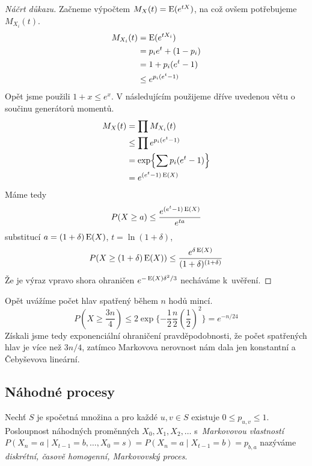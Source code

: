 \begin{proof}[Náčrt důkazu]

Začneme výpočtem $M_X(t) = \operatorname{E}(e^{tX})$, na což
ovšem potřebujeme $M_{X_i}(t)$.
\begin{align*}
    M_{X_i}(t) &= \operatorname{E}(e^{t X_i}) \\
    &= p_i e^t + (1 - p_i) \\
    &= 1 + p_i (e^t - 1) \\
    &\leq e^{p_i(e^t - 1)}
\end{align*}
Opět jsme použili $1 + x \leq e^x$. V následujícím použijeme dříve
uvedenou větu o součinu generátorů momentů.
\begin{align*}
    M_X(t) &= \prod M_{X_i}(t) \\
    &\leq \prod e^{p_i(e^t - 1)} \\
    &= \exp{\sum p_i(e^t - 1)} \\
    &= e^{(e^t-1)\operatorname{E}(X)}
\end{align*}
Máme tedy
\[
    P(X \geq a) \leq \frac{e^{(e^t-1)\operatorname{E}(X)}}{e^{ta}}
\]
substitucí $a = (1+\delta)\operatorname{E}(X)$, $t = \ln(1 + \delta)$,
\[
    P(X \geq (1 + \delta) \operatorname{E}(X)) \leq
    \frac{e^{\delta \operatorname{E}(X)}}{(1+\delta)^{(1+\delta)}}
\]
Že je výraz vpravo shora ohraničen $e^{- \operatorname{E}(X) \delta^2 / 3}$
necháváme k~uvěření.
\end{proof}

\begin{example}
    Opět uvážíme počet hlav spatřený během $n$ hodů mincí.
    \[
        P(X \geq \frac{3n}{4})
        \leq 2 \exp \{ - \frac{1}{2} \frac{n}{2} (\frac{1}{2})^2 \}
        = e^{-n/24}
    \]
    Získali jsme tedy exponenciální ohraničení pravděpodobnosti, že
    počet spatřených hlav je více než $3n/4$, zatímco Markovova
    nerovnost nám dala jen konstantní a Čebyševova lineární.
\end{example}

\subsection{Náhodné procesy}

\begin{definition}
    Nechť $S$ je spočetná množina a pro každé $u,v \in S$
    existuje $0 \leq p_{u,v} \leq 1$.
    Posloupnost náhodných proměnných $X_0, X_1, X_2, \ldots$
    s~{\em Markovovou vlastností}
    $P(X_n = a \mid X_{t-1} = b, \ldots, X_{0} = s)
    = P(X_n = a \mid X_{t-1} = b)
    = p_{b,a}$
    nazýváme {\em diskrétní, časově homogenní, Markovovský proces}.
\end{definition}

